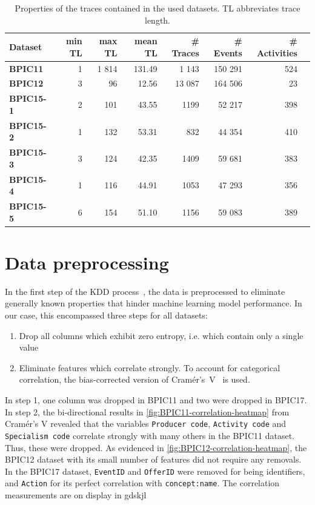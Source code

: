 \begin{table}[]
\centering
\begin{tabular}{lrrrrrrr}
\textbf{Dataset} & \textbf{min TL} & \textbf{max TL} &  \textbf{mean TL} & \textbf{\# Traces} & \textbf{\# Events} & \textbf{\# Activities} \\
\hline
\textbf{BPIC11} & 1 & 1 814 & 131.49 & 1 143 & 150 291 & 524\\
\textbf{BPIC12} & 3 & 96 & 12.56 & 13 087 & 164 506 & 23\\
\textbf{BPIC15-1} & 2 & 101 & 43.55 & 1199 & 52 217 & 398\\
\textbf{BPIC15-2} & 1 & 132 & 53.31 & 832 & 44 354 & 410\\
\textbf{BPIC15-3} & 3 & 124 & 42.35 & 1409 & 59 681 & 383\\
\textbf{BPIC15-4} & 1 & 116 & 44.91 & 1053 & 47 293 & 356\\
\textbf{BPIC15-5} & 6 & 154 & 51.10 & 1156 & 59 083 & 389\\
\end{tabular}
\caption{Properties of the traces contained in the used datasets. TL abbreviates trace length.}
\label{tab:dataset-characteristics}
\end{table}

\section{Data preprocessing}
\label{sec:eval:data-preprocessing}
In the first step of the KDD process~\cite{fayyad1996data}, the data is preprocessed to eliminate generally known properties that hinder machine learning model performance. In our case, this encompassed three steps for all datasets:

\begin{enumerate}
    \item Drop all columns which exhibit zero entropy, i.e. which contain only a single value
    \item Eliminate features which correlate strongly. To account for categorical correlation, the bias-corrected version of Cramér's~V~\cite{bergsma2013bias} is used.
\end{enumerate}

In step 1, one column was dropped in BPIC11 and two were dropped in BPIC17.
In step 2, the bi-directional results in \autoref{fig:BPIC11-correlation-heatmap} from Cramér's V revealed that the variables \texttt{Producer code}, \texttt{Activity code} and \texttt{Specialism code} correlate strongly with many others in the BPIC11 dataset. Thus, these were dropped. As evidenced in \autoref{fig:BPIC12-correlation-heatmap}, the BPIC12 dataset with its small number of features did not require any removals. In the BPIC17 dataset, \texttt{EventID} and \texttt{OfferID} were removed for being identifiers, and \texttt{Action} for its perfect correlation with \texttt{concept:name}. The correlation measurements are on display in gdskjl

